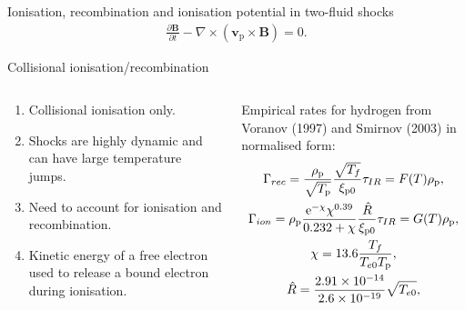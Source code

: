 \documentclass[10pt,aspectratio=169,usenames,dvipsnames]{beamer}
\begin{document}
\begin{frame}{Ionisation, recombination and ionisation potential in two-fluid shocks}
\begin{gather}
\frac{\partial \textbf{B}}{\partial t} - \nabla \times (\textbf{v}_{\text{p}} \times \textbf{B}) = 0.\tag{11}
\end{gather}
\end{frame}

\begin{frame}{Collisional ionisation/recombination}
\begin{columns}
\begin{column}{0.4\textwidth}
\begin{enumerate}
\item Collisional ionisation only.
\item Shocks are highly dynamic and can have large temperature jumps.
\item Need to account for ionisation and recombination.
\item Kinetic energy of a free electron used to release a bound electron during ionisation.
\end{enumerate}
\end{column}
\begin{column}{0.6\textwidth}
Empirical rates for hydrogen from Voranov (1997) and Smirnov (2003) in normalised form:
    \begin{gather}
    \Gamma_{rec} = \frac{\rho_{\rm p}}{\sqrt{T_{\rm p}}} \frac{\sqrt{T_f}}{\xi _{{\rm p}0}} \tau _{IR} = F(T) \rho_{\rm p}, \\
    \Gamma_{ion} = \rho_{\rm p} \frac{\mbox{e} ^{-\chi} \chi ^{0.39} }{0.232 + \chi} \frac{\hat{R}}{\xi _{{\rm p}0}} \tau _{IR} = G(T) \rho_{\rm p}, \\
    \chi = 13.6 \frac{T_f}{T_{e0} T_{\rm p}}, \\
    \hat{R} = \frac{2.91 \times 10 ^{-14}}{2.6 \times 10^{-19}} \sqrt{T_{e0}},
\end{gather}
\end{column}
\end{columns}
\end{frame}
\end{document}
